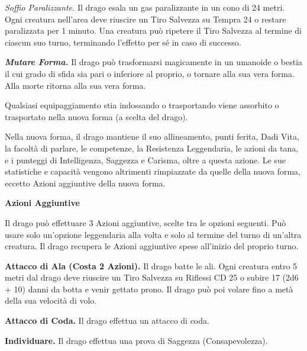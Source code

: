 \begin{multicols}{2}
\emph{Soffio Paralizzante.} Il drago esala un gas paralizzante in un cono di 24 metri. Ogni creatura nell'area deve riuscire un Tiro Salvezza su Tempra 24 o restare paralizzata per 1 minuto. Una creatura può ripetere il Tiro Salvezza al termine di ciascun suo turno, terminando l'effetto per sé in caso di successo.

\emph{\textbf{Mutare Forma.}} Il drago può trasformarsi magicamente in un umanoide o bestia il cui grado di sfida sia pari o inferiore al proprio, o tornare alla sua vera forma. Alla morte ritorna alla sua vera forma. 

Qualsiasi equipaggiamento stia indossando o trasportando viene assorbito o trasportato nella nuova forma (a scelta del drago).

Nella nuova forma, il drago mantiene il suo allineamento, punti ferita, Dadi Vita, la facoltà di parlare, le competenze, la Resistenza Leggendaria, le azioni da tana, e i punteggi di Intelligenza, Saggezza  e Carisma, oltre a questa azione. Le sue statistiche e capacità vengono altrimenti rimpiazzate da quelle della nuova forma, eccetto Azioni aggiuntive della nuova forma.

\textbf{Azioni Aggiuntive}

Il drago può effettuare 3 Azioni aggiuntive, scelte tra le opzioni seguenti. Può usare solo un'opzione leggendaria alla volta e solo al termine del turno di un'altra creatura. Il drago recupera le  Azioni aggiuntive spese all'inizio del proprio turno.

\textbf{Attacco di Ala (Costa 2 Azioni).} Il drago batte le ali. Ogni  creatura entro 5 metri dal drago deve riuscire un Tiro Salvezza  su Riflessi CD 25 o subire 17 (2d6 + 10) danni da botta e  venir gettato prono. Il drago può poi volare fino a metà della sua  velocità di volo.

\textbf{Attacco di Coda.} Il drago effettua un attacco di coda.

\textbf{Individuare.} Il drago effettua una prova di Saggezza (Consapevolezza).


\end{multicols}
